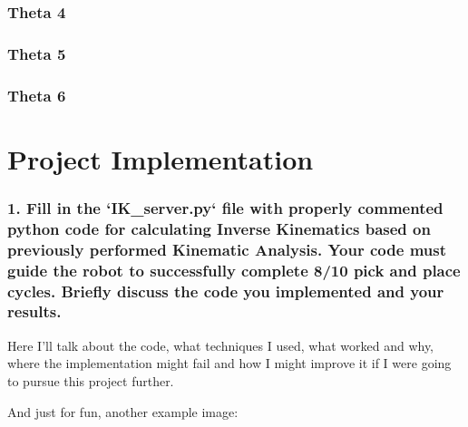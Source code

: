 \documentclass{article}
\begin{document}
\subsubsection{Theta 4}

\subsubsection{Theta 5}

\subsubsection{Theta 6}

\section{Project Implementation}

\subsubsection{1. Fill in the `IK\_server.py` file with properly commented python code for calculating Inverse Kinematics based on previously performed Kinematic Analysis. Your code must guide the robot to successfully complete 8/10 pick and place cycles. Briefly discuss the code you implemented and your results.}


Here I'll talk about the code, what techniques I used, what worked and why, where the implementation might fail and how I might improve it if I were going to pursue this project further.  


And just for fun, another example image:
\end{document}
